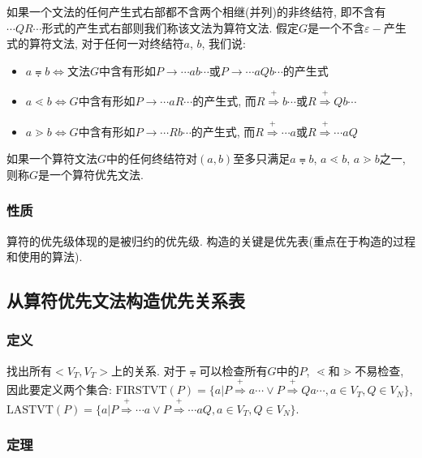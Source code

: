                 如果一个文法的任何产生式右部都不含两个相继(并列)的非终结符, 即不含有$\cdots QR\cdots$形式的产生式右部则我们称该文法为\textsf{算符文法}. 假定$G$是一个不含$\varepsilon-$产生式的算符文法, 对于任何一对终结符$a$, $b$, 我们说: 
                \begin{itemize}
                    \item $a\eqdot b\iff$文法$G$中含有形如$P\to \cdots ab\cdots$或$P\to \cdots aQb\cdots$的产生式
                    \item $a\lessdot b\iff G$中含有形如$P\to \cdots aR\cdots$的产生式, 而$R\stackrel{+}{\Rightarrow}b\cdots$或$R\stackrel{+}{\Rightarrow}Qb\cdots$
                    \item $a\gtrdot b\iff G$中含有形如$P\to \cdots Rb\cdots$的产生式, 而$R\stackrel{+}{\Rightarrow}\cdots a$或$R\stackrel{+}{\Rightarrow}\cdots aQ$
                \end{itemize}
                如果一个算符文法$G$中的任何终结符对$(a,b)$至多只满足$a\eqdot b$, $a\lessdot b$, $a\gtrdot b$之一, 则称$G$是一个\textsf{算符优先文法}.

            \subsubsection{性质}

                算符的优先级体现的是被归约的优先级. 构造的关键是\textsf{优先表}(重点在于构造的过程和使用的算法).

        \subsection{从算符优先文法构造优先关系表}

            \subsubsection{定义}

                找出所有$<V_T, V_T>$上的关系. 对于$\eqdot$可以检查所有$G$中的$P$, $\lessdot$和$\gtrdot$不易检查, 因此要定义两个集合: $\mathrm{FIRSTVT}(P)=\{a|P\stackrel{+}{\Rightarrow}a\cdots\vee P\stackrel{+}{\Rightarrow}Qa\cdots, a\in V_T, Q\in V_N\}$, $\mathrm{LASTVT}(P)=\{a|P\stackrel{+}{\Rightarrow}\cdots a\vee P\stackrel{+}{\Rightarrow}\cdots aQ, a\in V_T, Q\in V_N\}$.

            \subsubsection{定理}

